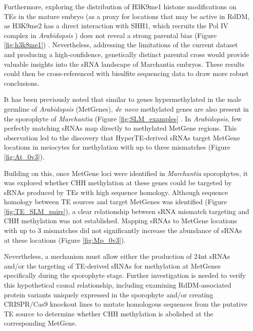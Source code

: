  Furthermore, exploring the distribution of H3K9me1 histone modifications on TEs in the mature embryo (as a proxy for locations that may be active in RdDM, as H3K9me2 has a direct interaction with SHH1, which recruits the Pol IV complex in \textit{Arabidopsis} \cite{RN116}) does not reveal a strong parental bias (Figure \ref{fig:h3k8me1}) \cite{RN160}. Nevertheless, addressing the limitations of the current dataset and producing a high-confidence, genetically distinct parental cross would provide valuable insights into the sRNA landscape of Marchantia embryos. These results could then be cross-referenced with bisulfite sequencing data to draw more robust conclusions.

It has been previously noted that similar to genes hypermethylated in the male germline of \textit{Arabidopsis} (MetGenes), \textit{de novo} methylated genes are also present in the sporophyte of \textit{Marchantia} (Figure \ref{fig:SLM_examples} \cite{jimmythesis}. In \textit{Arabidopsis}, few perfectly matching sRNAs map directly to methylated MetGene regions. This observation led to the discovery that HyperTE-derived sRNAs target MetGene locations in meiocytes for methylation with up to three mismatches \cite{RN187} (Figure \ref{fig:At_0v3}). 

Building on this, once MetGene loci were identified in \textit{Marchantia} sporophytes, it was explored whether CHH methylation  at these genes could be targeted by sRNAs produced by TEs with high sequence homology. Although sequence homology between TE sources and target MetGenes was identified (Figure \ref{fig:TE_SLM_pairs}), a clear relationship between sRNA mismatch targeting and CHH methylation was not established. Mapping sRNAs to MetGene locations with up to 3 mismatches did not significantly increase the abundance of sRNAs at these locations (Figure \ref{fig:Mp_0v3}). 

Nevertheless, a mechanism must allow either the production of 24nt sRNAs and/or the targeting of TE-derived sRNAs for methylation at MetGenes specifically during the sporophyte stage. Further investigation is needed to verify this hypothetical causal relationship, including examining RdDM-associated protein variants uniquely expressed in the sporophyte and/or creating CRISPR/Cas9 knockout lines to mutate homologous sequences from the putative TE source to determine whether CHH methylation is abolished at the corresponding MetGene.

